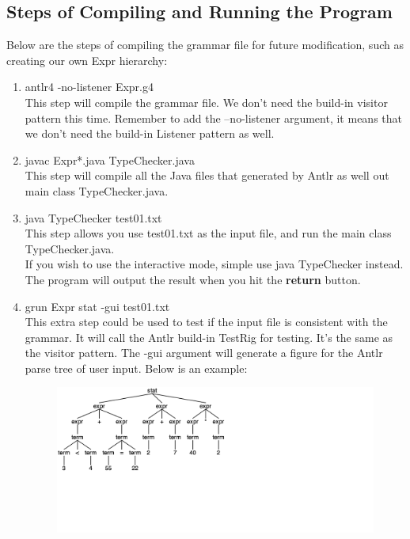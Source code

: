 \documentclass[a4paper,12pt,titlepage]{article}
\begin{document}
\subsection {Steps of Compiling and Running the Program}
Below are the steps of compiling the grammar file for future modification, such as creating our own Expr hierarchy:
\begin{enumerate}
	\item {\footnotesize\ttfamily antlr4 -no-listener Expr.g4} \\
  	This step will compile the grammar file. We don't need the build-in visitor pattern this time. Remember to add the {\footnotesize\ttfamily --no-listener} argument, it means that we don't need the build-in Listener pattern as well.
	\item {\footnotesize\ttfamily javac Expr*.java TypeChecker.java} \\
	This step will compile all the Java files that generated by Antlr as well out main class TypeChecker.java. \\
	\item {\footnotesize\ttfamily java TypeChecker test01.txt} \\
	This step allows you use test01.txt as the input file, and run the main class TypeChecker.java. \\
	If you wish to use the interactive mode, simple use {\footnotesize\ttfamily java TypeChecker} instead. The program will output the result when you hit the {\bf return} button.
	\item {\footnotesize\ttfamily grun Expr stat -gui test01.txt} \\
	This extra step could be used to test if the input file is consistent with the grammar. It will call the Antlr build-in TestRig for testing. It's the same as the visitor pattern.
	The {-gui} argument will generate a figure for the Antlr parse tree of user input. Below is an example:
		\begin{figure}[H]
		\centering
		\includegraphics[width=\linewidth]{antlr4_parse_tree.png}
		\end{figure}
\end{enumerate}
\end{document}
